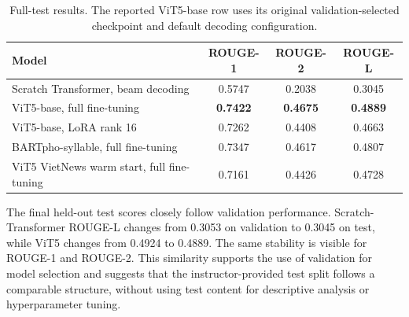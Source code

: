 \documentclass[conference]{IEEEtran}
\begin{document}
\begin{table}[htbp]
\centering
\caption{Validation decoding comparison using the same trained checkpoint.}
\label{tab:decoding_results}
\end{table}

\begin{table}[htbp]
\centering
\caption{Full-test results. The reported ViT5-base row uses its original validation-selected checkpoint and default decoding configuration.}
\label{tab:test_results}
\begin{tabular}{lccc}
\toprule
Model & ROUGE-1 & ROUGE-2 & ROUGE-L \\
\midrule
Scratch Transformer, beam decoding & 0.5747 & 0.2038 & 0.3045 \\
ViT5-base, full fine-tuning & \textbf{0.7422} & \textbf{0.4675} & \textbf{0.4889} \\
ViT5-base, LoRA rank 16 & 0.7262 & 0.4408 & 0.4663 \\
BARTpho-syllable, full fine-tuning & 0.7347 & 0.4617 & 0.4807 \\
ViT5 VietNews warm start, full fine-tuning & 0.7161 & 0.4426 & 0.4728 \\
\bottomrule
\end{tabular}
\end{table}

The final held-out test scores closely follow validation performance. Scratch-Transformer ROUGE-L changes from 0.3053 on validation to 0.3045 on test, while ViT5 changes from 0.4924 to 0.4889. The same stability is visible for ROUGE-1 and ROUGE-2. This similarity supports the use of validation for model selection and suggests that the instructor-provided test split follows a comparable structure, without using test content for descriptive analysis or hyperparameter tuning.
\end{document}
